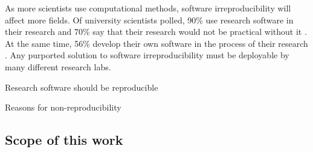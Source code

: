 
As more scientists use computational methods, software irreproducibility will affect more fields.
Of university scientists polled, 90\% use research software in their research and 70\% say that their research would not be practical without it \cite{researchSoftwareSurvey}.
At the same time, 56\% develop their own software in the process of their research \cite{researchSoftwareSurvey}.
Any purported solution to software irreproducibility must be deployable by many different research labs.


Research software should be reproducible

Reasons for non-reproducibility

\subsection{Scope of this work}
